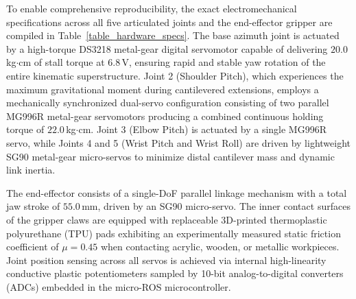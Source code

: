 \documentclass[journal]{IEEEtran}
\begin{document}
To enable comprehensive reproducibility, the exact electromechanical specifications across all five articulated joints and the end-effector gripper are compiled in Table~\ref{table_hardware_specs}. The base azimuth joint is actuated by a high-torque DS3218 metal-gear digital servomotor capable of delivering $20.0$\,kg$\cdot$cm of stall torque at $6.8$\,V, ensuring rapid and stable yaw rotation of the entire kinematic superstructure. Joint 2 (Shoulder Pitch), which experiences the maximum gravitational moment during cantilevered extensions, employs a mechanically synchronized dual-servo configuration consisting of two parallel MG996R metal-gear servomotors producing a combined continuous holding torque of $22.0$\,kg$\cdot$cm. Joint 3 (Elbow Pitch) is actuated by a single MG996R servo, while Joints 4 and 5 (Wrist Pitch and Wrist Roll) are driven by lightweight SG90 metal-gear micro-servos to minimize distal cantilever mass and dynamic link inertia.

The end-effector consists of a single-DoF parallel linkage mechanism with a total jaw stroke of $55.0$\,mm, driven by an SG90 micro-servo. The inner contact surfaces of the gripper claws are equipped with replaceable 3D-printed thermoplastic polyurethane (TPU) pads exhibiting an experimentally measured static friction coefficient of $\mu = 0.45$ when contacting acrylic, wooden, or metallic workpieces. Joint position sensing across all servos is achieved via internal high-linearity conductive plastic potentiometers sampled by 10-bit analog-to-digital converters (ADCs) embedded in the micro-ROS microcontroller.

\begin{table}[!t]
\centering
\caption{Comprehensive Electromechanical Specifications of the ARIA 5-DoF Manipulator}
\label{table_hardware_specs}
\footnotesize
{}
\end{table}
\end{document}
